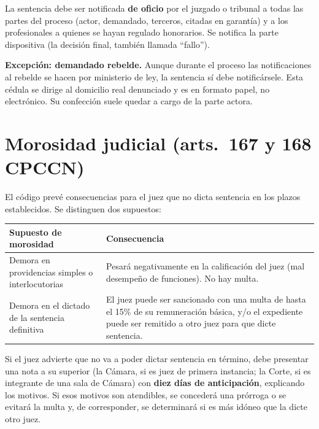 \documentclass[12pt,oneside]{book}
\begin{document}
La sentencia debe ser notificada \textbf{de oficio} por el juzgado o tribunal a todas las partes del proceso (actor, demandado, terceros, citadas en garantía) y a los profesionales a quienes se hayan regulado honorarios. Se notifica la parte dispositiva (la decisión final, también llamada ``fallo'').

\textbf{Excepción: demandado rebelde.} Aunque durante el proceso las notificaciones al rebelde se hacen por ministerio de ley, la sentencia sí debe notificársele. Esta cédula se dirige al domicilio real denunciado y es en formato papel, no electrónico. Su confección suele quedar a cargo de la parte actora.

\section{Morosidad judicial (arts.~167 y 168 CPCCN)}

El código prevé consecuencias para el juez que no dicta sentencia en los plazos establecidos. Se distinguen dos supuestos:

\begin{table}[H]
\centering
\begin{tabularx}{\textwidth}{>{\raggedright\arraybackslash}p{5cm} >{\raggedright\arraybackslash}X}
\toprule
\textbf{Supuesto de morosidad} & \textbf{Consecuencia} \\
\midrule
Demora en providencias simples o interlocutorias & Pesará negativamente en la calificación del juez (mal desempeño de funciones). No hay multa. \\
\addlinespace
Demora en el dictado de la sentencia definitiva & El juez puede ser sancionado con una multa de hasta el 15\% de su remuneración básica, y/o el expediente puede ser remitido a otro juez para que dicte sentencia. \\
\bottomrule
\end{tabularx}
\end{table}

Si el juez advierte que no va a poder dictar sentencia en término, debe presentar una nota a su superior (la Cámara, si es juez de primera instancia; la Corte, si es integrante de una sala de Cámara) con \textbf{diez días de anticipación}, explicando los motivos. Si esos motivos son atendibles, se concederá una prórroga o se evitará la multa y, de corresponder, se determinará si es más idóneo que la dicte otro juez.
\end{document}
